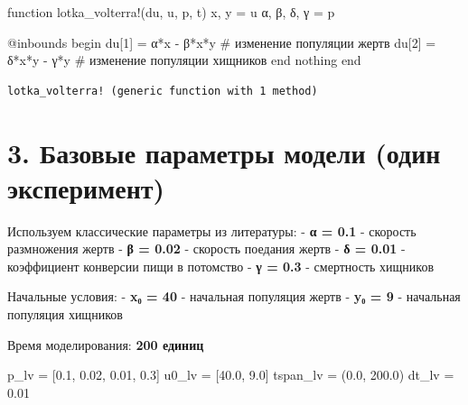 \documentclass[
  12pt,
  a4paper,
  DIV=11,
  numbers=noendperiod]{scrreprt}
\newenvironment{Shaded}{\begin{snugshade}}{\end{snugshade}}
\newcommand{\CommentTok}[1]{\textcolor[rgb]{0.37,0.37,0.37}{#1}}
\newcommand{\ConstantTok}[1]{\textcolor[rgb]{0.56,0.35,0.01}{#1}}
\newcommand{\ControlFlowTok}[1]{\textcolor[rgb]{0.00,0.23,0.31}{#1}}
\newcommand{\FloatTok}[1]{\textcolor[rgb]{0.68,0.00,0.00}{#1}}
\newcommand{\FunctionTok}[1]{\textcolor[rgb]{0.28,0.35,0.67}{#1}}
\newcommand{\KeywordTok}[1]{\textcolor[rgb]{0.00,0.23,0.31}{#1}}
\newcommand{\NormalTok}[1]{\textcolor[rgb]{0.00,0.23,0.31}{#1}}
\newcommand{\OperatorTok}[1]{\textcolor[rgb]{0.37,0.37,0.37}{#1}}
\newcommand{\PreprocessorTok}[1]{\textcolor[rgb]{0.68,0.00,0.00}{#1}}
\begin{document}
\begin{Shaded}
\begin{Highlighting}[]
\KeywordTok{function} \FunctionTok{lotka\_volterra!}\NormalTok{(du, u, p, t)}
\NormalTok{    x, y }\OperatorTok{=}\NormalTok{ u}
\NormalTok{    α, β, δ, γ }\OperatorTok{=}\NormalTok{ p}

    \PreprocessorTok{@inbounds} \ControlFlowTok{begin}
\NormalTok{        du[}\FloatTok{1}\NormalTok{] }\OperatorTok{=}\NormalTok{ α}\OperatorTok{*}\NormalTok{x }\OperatorTok{{-}}\NormalTok{ β}\OperatorTok{*}\NormalTok{x}\OperatorTok{*}\NormalTok{y  }\CommentTok{\# изменение популяции жертв}
\NormalTok{        du[}\FloatTok{2}\NormalTok{] }\OperatorTok{=}\NormalTok{ δ}\OperatorTok{*}\NormalTok{x}\OperatorTok{*}\NormalTok{y }\OperatorTok{{-}}\NormalTok{ γ}\OperatorTok{*}\NormalTok{y   }\CommentTok{\# изменение популяции хищников}
    \ControlFlowTok{end}
    \ConstantTok{nothing}
\KeywordTok{end}
\end{Highlighting}
\end{Shaded}

\begin{verbatim}
lotka_volterra! (generic function with 1 method)
\end{verbatim}

\section{3. Базовые параметры модели (один
эксперимент)}\label{ux431ux430ux437ux43eux432ux44bux435-ux43fux430ux440ux430ux43cux435ux442ux440ux44b-ux43cux43eux434ux435ux43bux438-ux43eux434ux438ux43d-ux44dux43aux441ux43fux435ux440ux438ux43cux435ux43dux442}

Используем классические параметры из литературы: - \textbf{α = 0.1} -
скорость размножения жертв - \textbf{β = 0.02} - скорость поедания жертв
- \textbf{δ = 0.01} - коэффициент конверсии пищи в потомство - \textbf{γ
= 0.3} - смертность хищников

Начальные условия: - \textbf{x₀ = 40} - начальная популяция жертв -
\textbf{y₀ = 9} - начальная популяция хищников

Время моделирования: \textbf{200 единиц}

\begin{Shaded}
\begin{Highlighting}[]
\NormalTok{p\_lv }\OperatorTok{=}\NormalTok{ [}\FloatTok{0.1}\NormalTok{, }\FloatTok{0.02}\NormalTok{, }\FloatTok{0.01}\NormalTok{, }\FloatTok{0.3}\NormalTok{]}
\NormalTok{u0\_lv }\OperatorTok{=}\NormalTok{ [}\FloatTok{40.0}\NormalTok{, }\FloatTok{9.0}\NormalTok{]}
\NormalTok{tspan\_lv }\OperatorTok{=}\NormalTok{ (}\FloatTok{0.0}\NormalTok{, }\FloatTok{200.0}\NormalTok{)}
\NormalTok{dt\_lv }\OperatorTok{=} \FloatTok{0.01}
\end{Highlighting}
\end{Shaded}
\end{document}

